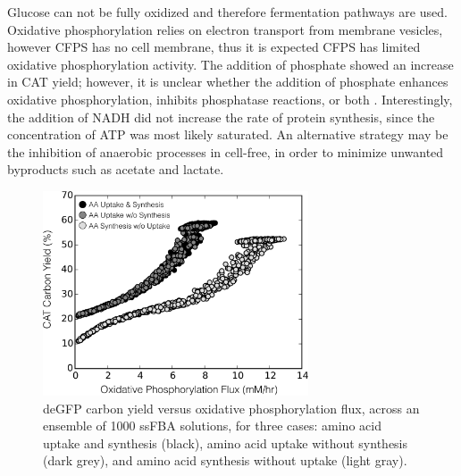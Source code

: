 \documentclass[journal=asbcd6,manuscript=article]{achemso}
\begin{document}
Glucose can not be fully oxidized and therefore fermentation pathways are used. 
Oxidative phosphorylation relies on electron transport from membrane vesicles, however CFPS has no cell membrane, thus it is expected CFPS has limited oxidative phosphorylation activity.
The addition of phosphate showed an increase in CAT yield; however, it is unclear whether the addition of phosphate enhances oxidative phosphorylation, inhibits phosphatase reactions, or both \cite{Jewett:2008aa}.
Interestingly, the addition of NADH did not increase the rate of protein synthesis, since the concentration of ATP was most likely saturated.
An alternative strategy may be the inhibition of anaerobic processes in cell-free, in order to minimize unwanted byproducts such as acetate and lactate.
\begin{figure}[t!]
\includegraphics[width=0.7\textwidth]{./Figures/Ox_yield.pdf}
\caption{deGFP carbon yield versus oxidative phosphorylation flux, across an ensemble of 1000 ssFBA solutions, for three cases: amino acid uptake and synthesis (black), amino acid uptake without synthesis (dark grey), and amino acid synthesis without uptake (light gray).}
\label{fig:oxphos_yield}
\end{figure}
\end{document}
